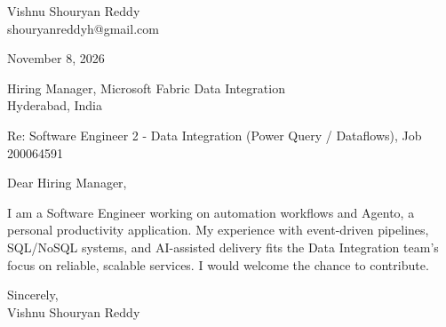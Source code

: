 \documentclass[a4paper,11pt]{article}
\begin{document}
\pagestyle{empty}

Vishnu Shouryan Reddy \\
shouryanreddyh@gmail.com

\vspace{1em}
November 8, 2026

\vspace{1em}
Hiring Manager, Microsoft Fabric Data Integration \\
Hyderabad, India

\vspace{1em}
Re: Software Engineer 2 - Data Integration (Power Query / Dataflows), Job 200064591

\vspace{1em}
Dear Hiring Manager,

\vspace{0.5em}
I am a Software Engineer working on automation workflows and Agento, a personal productivity application. My experience with event-driven pipelines, SQL/NoSQL systems, and AI-assisted delivery fits the Data Integration team's focus on reliable, scalable services. I would welcome the chance to contribute.

\vspace{1em}
Sincerely, \\
Vishnu Shouryan Reddy
\end{document}
